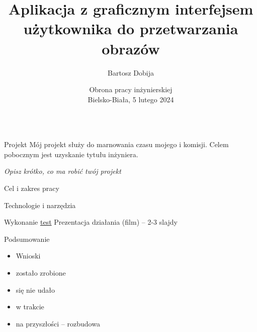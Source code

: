 \documentclass[aspectratio=1610,handout]{beamer}
\title{Aplikacja z graficznym interfejsem użytkownika do przetwarzania obrazów}
\author[Bartosz Dobija]{Bartosz Dobija}
\institute{Uniwersytet Bielsko-Bialski\\ Wydział Budowy Maszyn i Informatyki}
\date[5 lutego 2024]{Obrona pracy inżynierskiej \\ Bielsko-Biała, 5 lutego 2024}
\theoremstyle{definition}
\begin{document}
\begin{frame}{$ $}
 \titlepage
\end{frame}

\begin{frame}{Projekt}
    Mój projekt służy do marnowania czasu mojego i komisji. Celem pobocznym jest uzyskanie tytułu inżyniera.

    \textit{Opisz krótko, co ma robić twój projekt}
\end{frame}

\begin{frame}{Cel i zakres pracy}
    
\end{frame}

\begin{frame}{Technologie i narzędzia}
    
\end{frame}

\begin{frame}{Wykonanie}
    \href{run:./imgs/run1.mp4}{test}
    Prezentacja działania (film) – 2-3 slajdy
\end{frame}

\begin{frame}{Podsumowanie}
    \begin{itemize}
        \item Wnioski
        \item  zostało zrobione
        \item  się nie udało
        \item  w trakcie
        \item  na przyszłości – rozbudowa
    \end{itemize}
\end{frame}
\end{document}
